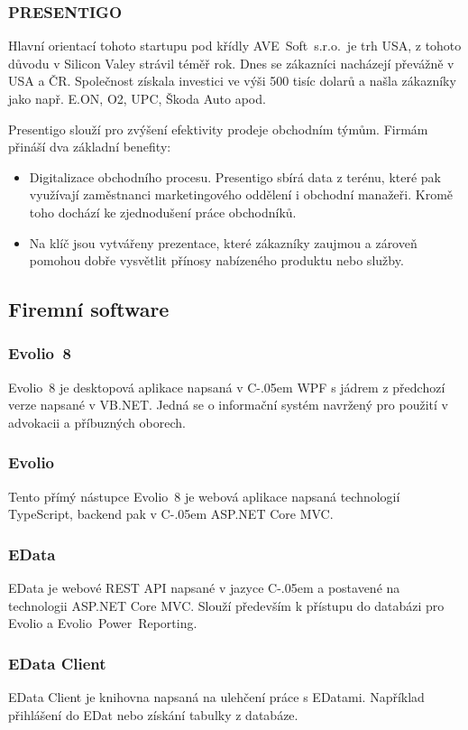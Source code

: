 \documentclass[czech,bachelor,dept460,male,csharp]{diploma}
\newcommand{\AveSoft}{AVE~Soft~s.r.o.}
\newcommand{\EvolioEight}{Evolio~8}
\newcommand{\EFilters}{Evolio~Power~Reporting}
\newcommand{\EvolioX}{Evolio}
\newcommand{\EData}{EData}
\newcommand{\Csharp}{%
  {\settoheight{\dimen0}{C}C\kern-.05em \resizebox{!}{\dimen0}{\raisebox{\depth}{\#}}}}
\begin{document}
 		\subsubsection{PRESENTIGO}
 		Hlavní orientací tohoto startupu pod křídly \AveSoft\ je trh USA, z tohoto důvodu v Silicon Valey strávil téměř rok. Dnes se zákazníci nacházejí převážně v USA a ČR. Společnost získala investici ve výši 500 tisíc dolarů a našla zákazníky jako např. E.ON, O2, UPC, Škoda Auto apod.

		Presentigo slouží pro zvýšení efektivity prodeje obchodním týmům. Firmám přináší dva základní benefity:
		\begin{itemize}
			\item
			Digitalizace obchodního procesu. Presentigo sbírá data z terénu, které pak využívají zaměstnanci marketingového oddělení i obchodní manažeři. Kromě toho dochází ke zjednodušení práce obchodníků.
			\item
			Na klíč jsou vytvářeny prezentace, které zákazníky zaujmou a zároveň pomohou dobře vysvětlit přínosy nabízeného produktu nebo služby.
		\end{itemize}
	\subsection{Firemní software}
		\subsubsection{\EvolioEight}
		{\EvolioEight} je desktopová aplikace napsaná v {\Csharp} WPF s jádrem z předchozí verze napsané v VB.NET. Jedná se o informační systém navržený pro použití v advokacii a příbuzných oborech. 
		\subsubsection{\EvolioX}
		Tento přímý nástupce {\EvolioEight} je webová aplikace napsaná technologií TypeScript, backend pak v {\Csharp} ASP.NET Core MVC.
		\subsubsection{\EData}
		{\EData} je webové REST API napsané v jazyce {\Csharp} a postavené na technologii ASP.NET Core MVC.
		Slouží především k přístupu do databázi pro {\EvolioX} a {\EFilters}.
		\subsubsection{EData Client}
		EData Client je knihovna napsaná na ulehčení práce s EDatami. Například přihlášení do EDat nebo získání tabulky z databáze. 
\end{document}
